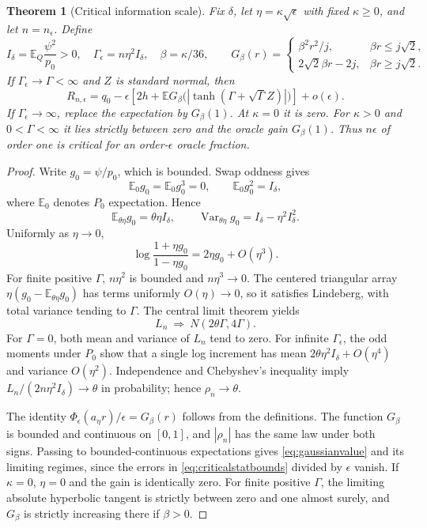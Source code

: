 \documentclass[11pt,a4paper]{amsart}
\theoremstyle{plain}
\newtheorem{theorem}{Theorem}[section]
\theoremstyle{definition}
\theoremstyle{remark}
\DeclareMathOperator{\Var}{Var}
\newcommand{\EE}{\mathbb{E}}
\begin{document}
\begin{theorem}[Critical information scale]\label{thm:gaussian}
Fix $\delta$, let $\eta=\kappa\sqrt\epsilon$ with fixed $\kappa\ge0$, and let $n=n_\epsilon$. Define
\[
 I_\delta=\EE_Q\frac{\psi^2}{p_0}>0,\quad
 \Gamma_\epsilon=n\eta^2 I_\delta,\quad \beta=\kappa/36,
 \qquad
 G_\beta(r)=
 \begin{cases}
 \beta^2r^2/j,&\beta r\le j\sqrt2,\\
 2\sqrt2\beta r-2j,&\beta r\ge j\sqrt2.
 \end{cases}
\]
If $\Gamma_\epsilon\to\Gamma<\infty$ and $Z$ is standard normal, then
\begin{equation}\label{eq:gaussianvalue}
 R_{n,\epsilon}=q_0-\epsilon\left[
 2h+\EE G_\beta\bigl(|\tanh(\Gamma+\sqrt\Gamma Z)|\bigr)\right]+o(\epsilon).
\end{equation}
If $\Gamma_\epsilon\to\infty$, replace the expectation by $G_\beta(1)$. At $\kappa=0$ it is zero. For $\kappa>0$ and $0<\Gamma<\infty$ it lies strictly between zero and the oracle gain $G_\beta(1)$. Thus $n\epsilon$ of order one is critical for an order-$\epsilon$ oracle fraction.
\end{theorem}
\begin{proof}
Write $g_0=\psi/p_0$, which is bounded. Swap oddness gives
\[
 \EE_0g_0=\EE_0g_0^3=0,\qquad \EE_0g_0^2=I_\delta,
\]
where $\EE_0$ denotes $P_0$ expectation. Hence
\[
 \EE_{\theta\eta}g_0=\theta\eta I_\delta,\qquad
 \Var_{\theta\eta}g_0=I_\delta-\eta^2I_\delta^2.
\]
Uniformly as $\eta\to0$,
\begin{equation}\label{eq:logexpansion}
 \log\frac{1+\eta g_0}{1-\eta g_0}=2\eta g_0+O(\eta^3).
\end{equation}
For finite positive $\Gamma$, $n\eta^2$ is bounded and $n\eta^3\to0$. The centered triangular array $\eta(g_0-\EE_{\theta\eta}g_0)$ has terms uniformly $O(\eta)\to0$, so it satisfies Lindeberg, with total variance tending to $\Gamma$. The central limit theorem yields
\[
 L_n\ \Longrightarrow\ N(2\theta\Gamma,4\Gamma).
\]
For $\Gamma=0$, both mean and variance of $L_n$ tend to zero. For infinite $\Gamma_\epsilon$, the odd moments under $P_0$ show that a single log increment has mean $2\theta\eta^2I_\delta+O(\eta^4)$ and variance $O(\eta^2)$. Independence and Chebyshev's inequality imply
$L_n/(2n\eta^2I_\delta)\to\theta$ in probability; hence $\rho_n\to\theta$.

The identity $\Phi_\epsilon(a_\eta r)/\epsilon=G_\beta(r)$ follows from the definitions. The function $G_\beta$ is bounded and continuous on $[0,1]$, and $|\rho_n|$ has the same law under both signs. Passing to bounded-continuous expectations gives \eqref{eq:gaussianvalue} and its limiting regimes, since the errors in \eqref{eq:criticalstatbounds} divided by $\epsilon$ vanish. If $\kappa=0$, $\eta=0$ and the gain is identically zero. For finite positive $\Gamma$, the limiting absolute hyperbolic tangent is strictly between zero and one almost surely, and $G_\beta$ is strictly increasing there if $\beta>0$.
\end{proof}
\end{document}
